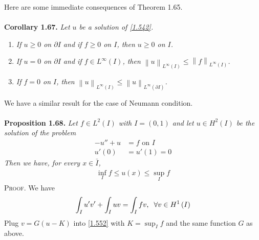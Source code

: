 \documentclass[a4paper,oneside]{article}
\numberwithin{equation}{section}
\begin{document}
Here are some immediate consequences of Theorem 1.65.\\
\\
\textbf{Corollary 1.67.} \textit{Let $u$ be a solution of \eqref{1.542}.}
\begin{enumerate}
\item \textit{If $u\ge 0$ on $\partial I$ and if $f\ge 0$ on $I$, then $u\ge 0$ on $I$.}
\item \textit{If $u=0$ on $\partial I$ and if $f\in L^{\infty}\left(I\right)$, then ${\left\| u \right\|_{{L^\infty }\left( I \right)}} \le {\left\| f \right\|_{{L^\infty }\left( I \right)}}$.}
\item \textit{If $f=0$ on $I$, then ${\left\| u \right\|_{{L^\infty }\left( I \right)}} \le {\left\| u \right\|_{{L^\infty }\left( {\partial I} \right)}}$.}
\end{enumerate}

We have a similar result for the case of Neumann condition.\\
\\
\textbf{Proposition 1.68.} \textit{Let $f\in L^2\left(I\right)$ with $I=\left(0,1\right)$ and let $u\in H^2\left(I\right)$ be the solution of the problem}
\begin{align}
\label{1.549}
 - u'' + u &= f\mbox{ on } I\\
u'\left( 0 \right) &= u'\left( 1 \right) = 0 \label{1.550}
\end{align}
\textit{Then we have, for every $x\in \bar I$,}
\begin{align}
\label{1.551}
\mathop {\inf }\limits_I f \le u\left( x \right) \le \mathop {\sup }\limits_I f
\end{align}
\textsc{Proof.} We have
\begin{align}
\label{1.552}
\int_I {u'v'}  + \int_I {uv}  = \int_I {fv} ,\hspace{0.2cm}\forall v \in {H^1}\left( I \right)
\end{align}
Plug $v=G\left(u-K\right)$ into \eqref{1.552} with $K=\sup _I f$ and the same function $G$ as above.
\end{document}
